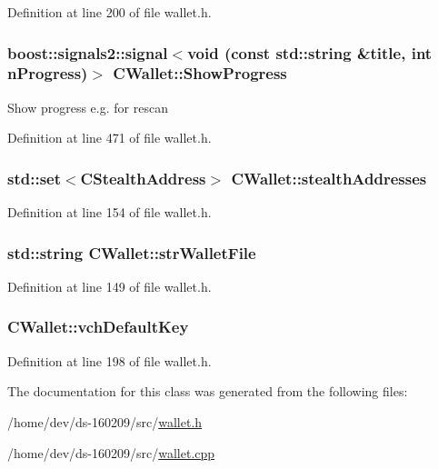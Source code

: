 Definition at line 200 of file wallet.\+h.

\hypertarget{class_c_wallet_a845a2f2911b9b022f0e58ab577e795ea}{}
\subsubsection[{Show\+Progress}]{\setlength{\rightskip}{0pt plus 5cm}boost\+::signals2\+::signal$<$void (const std\+::string \&title, int n\+Progress)$>$ C\+Wallet\+::\+Show\+Progress}\label{class_c_wallet_a845a2f2911b9b022f0e58ab577e795ea}
Show progress e.\+g. for rescan 

Definition at line 471 of file wallet.\+h.

\hypertarget{class_c_wallet_a148a31a8069304a6593b3c5266417b10}{}
\subsubsection[{stealth\+Addresses}]{\setlength{\rightskip}{0pt plus 5cm}std\+::set$<${\bf C\+Stealth\+Address}$>$ C\+Wallet\+::stealth\+Addresses}\label{class_c_wallet_a148a31a8069304a6593b3c5266417b10}


Definition at line 154 of file wallet.\+h.

\hypertarget{class_c_wallet_a3e886f3a3b20228770e082b3fc014fc7}{}
\subsubsection[{str\+Wallet\+File}]{\setlength{\rightskip}{0pt plus 5cm}std\+::string C\+Wallet\+::str\+Wallet\+File}\label{class_c_wallet_a3e886f3a3b20228770e082b3fc014fc7}


Definition at line 149 of file wallet.\+h.

\hypertarget{class_c_wallet_a6d415899e530a91e6e28dd0fa4ecef8d}{}
\subsubsection[{vch\+Default\+Key}]{ C\+Wallet\+::vch\+Default\+Key}\label{class_c_wallet_a6d415899e530a91e6e28dd0fa4ecef8d}


Definition at line 198 of file wallet.\+h.



The documentation for this class was generated from the following files\+:\begin{DoxyCompactItemize}
\item 
/home/dev/ds-\/160209/src/\hyperlink{wallet_8h}{wallet.\+h}\item 
/home/dev/ds-\/160209/src/\hyperlink{wallet_8cpp}{wallet.\+cpp}\end{DoxyCompactItemize}
